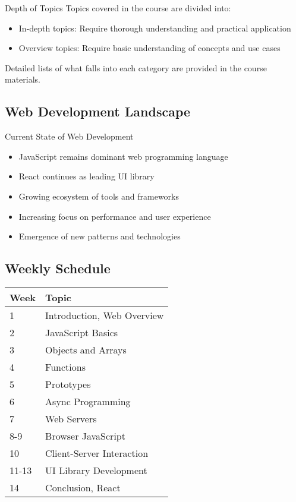 \begin{remark}{Depth of Topics}
Topics covered in the course are divided into:
\begin{itemize}
    \item In-depth topics: Require thorough understanding and practical application
    \item Overview topics: Require basic understanding of concepts and use cases
\end{itemize}
Detailed lists of what falls into each category are provided in the course materials.
\end{remark}

\subsection{Web Development Landscape}
\begin{concept}{Current State of Web Development}
    \begin{itemize}
        \item JavaScript remains dominant web programming language
        \item React continues as leading UI library
        \item Growing ecosystem of tools and frameworks
        \item Increasing focus on performance and user experience
        \item Emergence of new patterns and technologies
    \end{itemize}
\end{concept}

\subsection{Weekly Schedule}
\begin{table}[h]
\begin{tabular}{|l|l|}
\hline
\textbf{Week} & \textbf{Topic} \\
\hline
1 & Introduction, Web Overview \\
2 & JavaScript Basics \\
3 & Objects and Arrays \\
4 & Functions \\
5 & Prototypes \\
6 & Async Programming \\
7 & Web Servers \\
8-9 & Browser JavaScript \\
10 & Client-Server Interaction \\
11-13 & UI Library Development \\
14 & Conclusion, React \\
\hline
\end{tabular}
\end{table}

